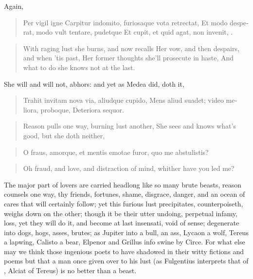 Again,

\begin{latin}
\begin{verse}
Per vigil igne
Carpitur indomito, furiosaque vota retrectat,
Et modo desperat, modo vult tentare, pudetque
Et cupit, et quid agat, non invenit, \etc{}.
\end{verse}
\end{latin}
\translationrule%
\begin{verse}%
With raging lust she burns, and now recalls
Her vow, and then despairs, and when 'tis past,
Her former thoughts she'll prosecute in haste,
And what to do she knows not at the last.
\end{verse}%

She will and will not, abhors: and yet as Medea did, doth it,

\begin{latin}
\begin{verse}
Trahit invitam nova via, aliudque cupido,
Mens aliud suadet; video meliora, proboque,
Deteriora sequor.
\end{verse}
\end{latin}
\translationrule%
\begin{verse}%
Reason pulls one way, burning lust another,
She sees and knows what's good, but she doth neither,
\end{verse}%

\begin{latin}
\begin{verse}
O fraus, amorque, et mentis emotae furor,
quo me abstulistis?
\end{verse}
\end{latin}
\translationrule%
\begin{verse}%
Oh fraud, and love, and distraction of mind,
whither have you led me?
\end{verse}%

The major part of lovers are carried headlong like so many brute
beasts, reason counsels one way, thy friends, fortunes, shame,
disgrace, danger, and an ocean of cares that will certainly follow; yet
this furious lust precipitates, counterpoiseth, weighs down on the
other; though it be their utter undoing, perpetual infamy, loss, yet
they will do it, and become at last insensati, void of sense;
degenerate into dogs, hogs, asses, brutes; as Jupiter into a bull,
\Apuleius an ass, Lycaon a wolf, Tereus a lapwing, Calisto a bear,
Elpenor and Grillus info swine by Circe. For what else may we think
those ingenious poets to have shadowed in their witty fictions and
poems but that a man once given over to his lust (as Fulgentius
interprets that of \Apuleius, Alciat of Tereus) is no better than a
beast.

